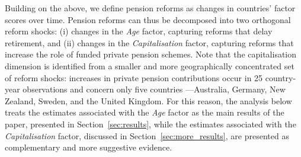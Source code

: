 \documentclass[11pt,english,a4paper, twoside, authoryear]{article}
\begin{document}
Building on the above, we define pension reforms as changes in countries' factor scores over time. Pension reforms can thus be decomposed into two orthogonal reform shocks: (i) changes in the \emph{Age} factor, capturing reforms that delay retirement, and (ii) changes in the \emph{Capitalisation} factor, capturing reforms that increase the role of funded private pension schemes. Note that the capitalisation dimension is identified from a smaller and more geographically concentrated set of reform shocks: increases in private pension contributions  occur in 25 country-year observations and concern only five countries ---Australia, Germany, New Zealand, Sweden, and the United Kingdom. %
For this reason, the analysis below treats the estimates associated with the \emph{Age} factor as the main results of the paper, presented in Section~\ref{sec:results}, while the estimates associated with the \emph{Capitalisation} factor, discussed in Section~\ref{sec:more_results}, are presented as complementary and more suggestive evidence.


\end{document}
